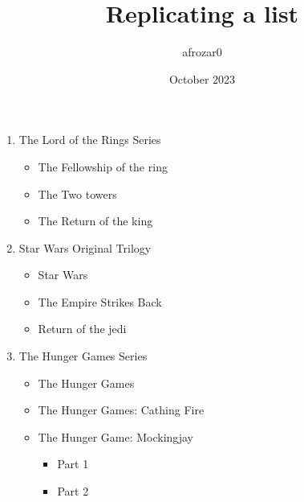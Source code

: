 \documentclass{article}
\title{Replicating a list}
\author{afrozar0 }
\date{October 2023}
\begin{document}
\maketitle

\begin{enumerate}
    \item The Lord of the Rings Series
    \begin{itemize}
        \item The Fellowship of the ring
        \item The Two towers
        \item The Return of the king
    \end{itemize}
    \item Star Wars Original Trilogy
    \begin{itemize}
        \item Star Wars
        \item The Empire Strikes Back
        \item Return of the jedi
    \end{itemize}
    \item The Hunger Games Series
    \begin{itemize}
        \item The Hunger Games
        \item The Hunger Games: Cathing Fire
        \item The Hunger Game: Mockingjay
        \begin{itemize}
            \item Part 1
            \item Part 2
        \end{itemize}
    \end{itemize}
\end{enumerate}
\end{document}
